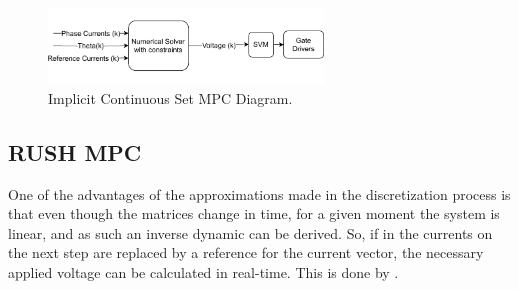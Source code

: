 \begin{figure}[!htb]
	\centering
	\includegraphics[width=0.65\textwidth]{Figures/Implicit_CSMPC.pdf}
	\caption[Implicit Continuous Set MPC Diagram.]{Implicit Continuous Set MPC Diagram.}
	\label{fig:implicit_csmpc_diagram}%
\end{figure}

\subsection{RUSH MPC}

One of the advantages of the approximations made in the discretization process is that even though the matrices change in time, for a given moment the system is linear, and as such an inverse dynamic can be derived. So, if in  the currents on the next step are replaced by a reference for the current vector, the necessary applied voltage can be calculated in real-time. This is done by .

